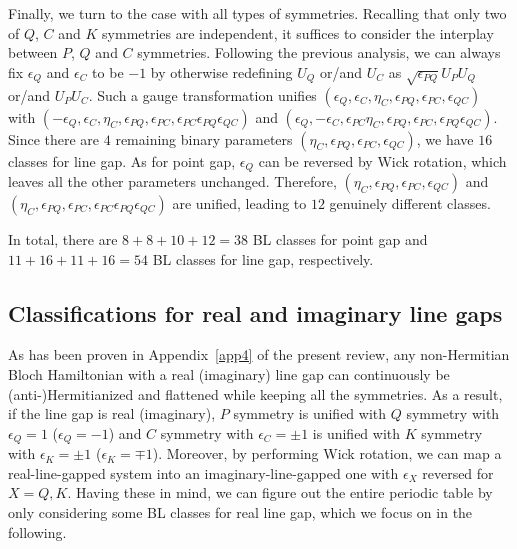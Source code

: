 \documentclass{tADP2e}
\theoremstyle{plain}
\theoremstyle{plain}
\theoremstyle{definition}
\begin{document}
\begin{appendices}
Finally, we turn to the case with all types of symmetries. Recalling that only two of $Q$, $C$ and $K$ symmetries are independent, it suffices to consider the interplay between $P$, $Q$ and $C$ symmetries. Following the previous analysis, we can always fix $\epsilon_Q$ and $\epsilon_C$ to be $-1$ by otherwise redefining $U_Q$ or/and $U_C$ as $\sqrt{\epsilon_{PQ}}U_PU_Q$ or/and $U_PU_C$. Such a gauge transformation unifies $(\epsilon_Q,\epsilon_C,\eta_C,\epsilon_{PQ},\epsilon_{PC},\epsilon_{QC})$ with $(-\epsilon_Q,\epsilon_C,\eta_C,\epsilon_{PQ},\epsilon_{PC},\epsilon_{PC}\epsilon_{PQ}\epsilon_{QC})$ and $(\epsilon_Q,-\epsilon_C,\epsilon_{PC}\eta_C,\epsilon_{PQ},\epsilon_{PC},\epsilon_{PQ}\epsilon_{QC})$. Since there are $4$ remaining binary parameters $(\eta_C,\epsilon_{PQ},\epsilon_{PC},\epsilon_{QC})$, we have $16$ classes for line gap. As for point gap, $\epsilon_Q$ can be reversed by Wick rotation, which leaves all the other parameters unchanged. Therefore, $(\eta_C,\epsilon_{PQ},\epsilon_{PC},\epsilon_{QC})$ and $(\eta_C,\epsilon_{PQ},\epsilon_{PC},\epsilon_{PC}\epsilon_{PQ}\epsilon_{QC})$ are unified, leading to $12$ genuinely different classes.

In total, there are $8+8+10+12=38$ BL classes for point gap and $11+16+11+16=54$ BL classes for line gap, respectively.



\subsection{Classifications for real and imaginary line gaps}\label{Sec:lgBL}
As has been proven in Appendix~\ref{app4} of the present review, any non-Hermitian Bloch Hamiltonian with a real (imaginary) line gap can continuously be (anti-)Hermitianized and flattened while keeping all the symmetries. 
As a result, if the line gap is real (imaginary), $P$ symmetry is unified with $Q$ symmetry with $\epsilon_Q=1$ ($\epsilon_Q=-1$) and $C$ symmetry with $\epsilon_C=\pm1$ is unified with $K$ symmetry with $\epsilon_K=\pm1$ ($\epsilon_K=\mp1$). Moreover, by performing Wick rotation, we can map a real-line-gapped system into an imaginary-line-gapped one with $\epsilon_X$ reversed for $X=Q,K$. Having these in mind, we can figure out the entire periodic table by only considering some BL classes for real line gap, which we focus on in the following.


\end{appendices}
\end{document}
